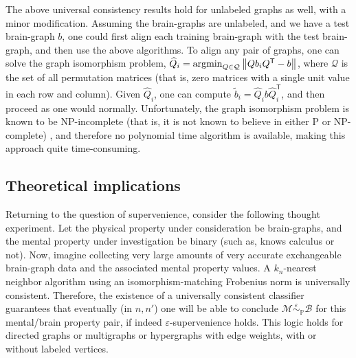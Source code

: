 \documentclass{article}
\newcommand{\mB}{\mathcal{B}}
\newcommand{\mM}{\mathcal{M}}
\newcommand{\PP}{\mathbb{P}}           %
\newcommand{\Real}{\mathbb{R}}           %
\providecommand{\mc}[1]{\mathcal{#1}}
\providecommand{\mh}[1]{\widehat{#1}}
\providecommand{\mt}[1]{\widetilde{#1}}
\newcommand{\argmin}{\operatornamewithlimits{argmin}}
\newcommand{\MeB}{\mM \overset{\varepsilon}{{\sim}}_{\PP} \mB}
\providecommand{\norm}[1]{\left \lVert#1 \right  \rVert}
\newcommand{\T}{^{\ensuremath{\mathsf{T}}}}           %
\begin{document}
The above universal consistency results hold for unlabeled graphs as well, with a minor modification. Assuming the brain-graphs are unlabeled, and we have a test brain-graph $b$, one could first align each training brain-graph with the test brain-graph, and then use the above algorithms.  To align any pair of graphs, one can solve the graph isomorphism problem, $\mh{Q}_i=\argmin_{Q \in \mc{Q}} \norm{Q b_i Q\T - b}$, where $\mc{Q}$ is the set of all permutation matrices (that is, zero matrices with a single unit value in each row and column).  Given $\mh{Q}_i$, one can compute $\mt{b}_i=\mh{Q}_i b \mh{Q}_i\T$, and then proceed as one would normally.  Unfortunately, the graph isomorphism problem is known to be NP-incomplete (that is, it is not known to believe in either P or NP-complete) \cite{GareyJohnson79}, and therefore no polynomial time algorithm is available, making this approach quite time-consuming.





\subsection{Theoretical implications} %
\label{sub:implications}

Returning to the question of supervenience, consider the following thought experiment.  Let the physical property under consideration be brain-graphs, and the mental property under investigation be binary (such as, knows calculus or not). Now, imagine collecting very large amounts of very accurate exchangeable brain-graph data and the associated mental property values. A $k_n$-nearest neighbor algorithm using an isomorphism-matching Frobenius norm is universally consistent. Therefore, %
the existence of a universally consistent classifier guarantees that eventually (in $n,n'$) one will be able to conclude $\MeB$ for this mental/brain property pair, if indeed $\varepsilon$-supervenience holds. This logic holds for directed graphs or multigraphs or hypergraphs with edge weights, with or without labeled vertices. 
\end{document}
